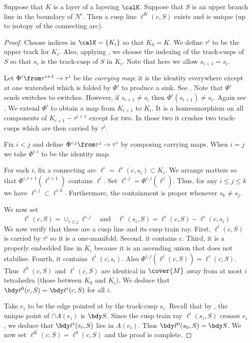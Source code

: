 \documentclass[12pt]{amsart}
\begin{document}
\begin{lemma}
\label{Lem:ConnectingLines}
Suppose that $K$ is a layer of a layering $\calK$.  Suppose that $S$ is an upper branch line in the boundary of $N^c$.  Then a cusp line $\ell^K(c, S)$ exists and is unique (up to isotopy of the connecting arc). 
\end{lemma}

\begin{proof}
Choose indices in $\calK = \{K_i\}$ so that $K_0 = K$.  We define $\tau^i$ to be the upper track for $K_i$.  Also, applying , we choose the indexing of the track-cusps of $S$ so that $s_i$ is the track-cusp of $S$ in $K_i$.  Note that here we allow $s_{i+1} = s_i$.  

Let $\Phi^i \from \tau^{i+1} \to \tau^i$ be the \emph{carrying map}; it is the identity everywhere except at one watershed which is folded by $\Phi^i$ to produce a sink.  See .  Note that $\Phi^i$ sends switches to switches. However, if $s_{i+1} \neq s_i$ then $\Phi^i(s_{i+1}) \neq s_i$. Again see .
 We extend $\Phi^i$ to obtain a map from $K_{i+1}$ to $K_i$.  It is a homeomorphism on all components of $K_{i+1} - \tau^{i+1}$ except for two.  In those two it crushes two track-cusps which are then carried by $\tau^i$. 

Fix $i < j$ and define $\Phi^{i,j} \from \tau^j \to \tau^i$ by composing carrying maps.  When $i = j$ we take $\Phi^{i,i}$ to be the identity map. 

For each $i$, fix a connecting arc $\ell^i = \ell^i(c, s_i) \subset K_i$.  We arrange matters so that $\Phi^{i, i+1}(\ell^{i+1})$ contains $\ell^i$.  Set $\ell^{i,j} = \Phi^{i,j}(\ell^j)$.  Thus, for any $i \leq j \leq k$ we have $\ell^{i,j} \subset \ell^{i,k}$.
Furthermore, the containment is proper whenever $s_k \neq s_j$.

We now set
\[
\ell^i(c, S) = \cup_{i \leq j} \ell^{i,j} \quad \text{and} \quad \ell^i(s_i,S) = \ell^i(c, S) - \ell^i(c, s_i)
\]
We now verify that these are a cusp line and its cusp train ray.  First, $\ell^i(c, S)$ is carried by $\tau^i$ so it is a one-manifold. Second, it contains $c$. Third, it is a properly embedded line in $K_i$ because it is an ascending union that does not stabilise. Fourth, it contains $\ell^i(c, s_i)$.  Also $\Phi^{i,j}(\ell^j(c, S)) = \ell^i(c, S)$.  Thus $\ell^0(c, S)$ and $\ell^i(c, S)$ are identical in $\cover{M}$ away from at most $i$ tetrahedra (those between $K_0$ and $K_i$).  We deduce that $\bdy \ell^0(c, S) = \bdy \ell^i(c, S)$ for all $i$. 


Take $e_i$ to be the edge pointed at by the track-cusp $s_i$. Recall that by , the unique point of $\cap A(e_i)$ is $\bdy S$. Since the cusp train ray $\ell^i(s_i, S)$ crosses $e_i$, we deduce that $\bdy \ell^i(s_i, S)$ lies in $A(e_i)$.  Thus $\bdy \ell^0(s_0, S) = \bdy S$.  We now set $\ell^K(c, S) = \ell^0(c, S)$ and the proof is complete. 
\end{proof}
\end{document}
